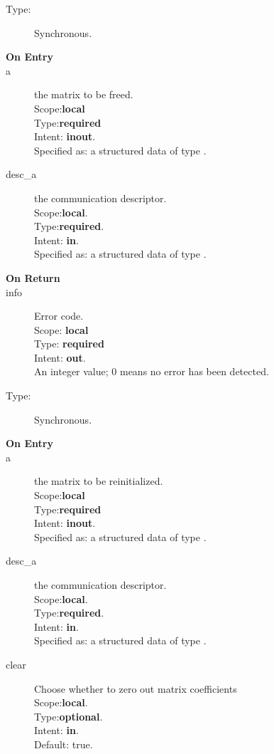 %
%


\begin{description}
\item[Type:] Synchronous.
\item[\bf On Entry]
\item[a] the matrix to be freed.\\
Scope:{\bf local}\\
Type:{\bf required}\\
Intent: {\bf inout}.\\
Specified as: a structured data of type \spdata.
\item[desc\_a] the communication descriptor.\\
Scope:{\bf local}.\\
Type:{\bf required}.\\
Intent: {\bf in}.\\
Specified as: a structured data of type \descdata.
\end{description}

\begin{description}
\item[\bf On Return]
\item[info] Error code.\\
Scope: {\bf local} \\
Type: {\bf required} \\
Intent: {\bf out}.\\
An integer value; 0 means no error has been detected. 
\end{description}




%
%


\begin{description}
\item[Type:] Synchronous.
\item[\bf On Entry]
\item[a] the matrix to be reinitialized.\\
Scope:{\bf local}\\
Type:{\bf required}\\
Intent: {\bf inout}.\\
Specified as: a structured data of type \spdata.
\item[desc\_a] the communication descriptor.\\
Scope:{\bf local}.\\
Type:{\bf required}.\\
Intent: {\bf in}.\\
Specified as: a structured data of type \descdata.
\item[clear] Choose whether to zero out matrix coefficients\\
Scope:{\bf local}.\\
Type:{\bf optional}.\\
Intent: {\bf in}.\\
Default: true.
\end{description}

